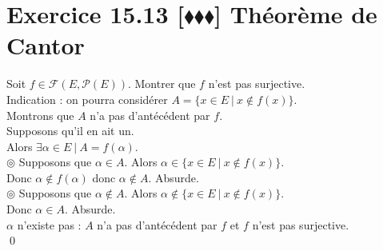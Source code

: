 \documentclass[10pt]{article}
\begin{document}

\section*{Exercice 15.13 [$\blacklozenge\blacklozenge\blacklozenge$] Théorème de Cantor}
\begin{tcolorbox}[enhanced, width=7.6in, center, size=fbox, fontupper=\large, drop shadow southwest]
    Soit $f\in\mathcal{F}(E, \mathcal{P}(E))$. Montrer que $f$ n'est pas surjective.\\
    Indication : on pourra considérer $A = \{x \in E ~ | ~ x \notin f(x)\}$.\\[0.2cm]
    Montrons que $A$ n'a pas d'antécédent par $f$.\\
    Supposons qu'il en ait un.\\
    Alors $\exists \alpha \in E ~ | ~ A = f(\alpha)$.\\
    $\circledcirc$ Supposons que $\alpha \in A$. Alors $\alpha \in \{x \in E ~ | ~ x \notin f(x)\}$.\\
    Donc $\alpha \notin f(\alpha)$ donc $\alpha \notin A$. Absurde.\\[0.15cm]
    $\circledcirc$ Supposons que $\alpha \notin A$. Alors $\alpha \notin \{x \in E ~ | ~ x \notin f(x)\}$.\\
    Donc $\alpha \in A$. Absurde.\\[0.15cm]
    $\alpha$ n'existe pas : $A$ n'a pas d'antécédent par $f$ et $f$ n'est pas surjective.\\
    \qed
\end{tcolorbox}
\end{document}
